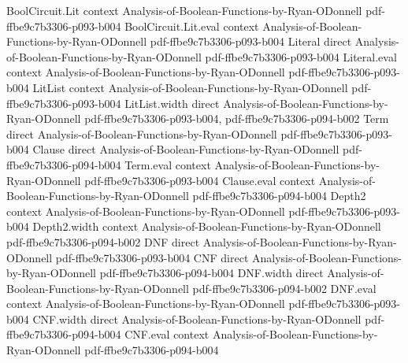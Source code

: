 \begin{theorem}
\label{DecisionTree.degree_le_depth}
\leanok
{}
\proofstep
  {BoolCircuit.Lit}
  {context}
  {Analysis-of-Boolean-Functions-by-Ryan-ODonnell}
  {pdf-ffbe9c7b3306-p093-b004}
\proofstep
  {BoolCircuit.Lit.eval}
  {context}
  {Analysis-of-Boolean-Functions-by-Ryan-ODonnell}
  {pdf-ffbe9c7b3306-p093-b004}
\proofstep
  {Literal}
  {direct}
  {Analysis-of-Boolean-Functions-by-Ryan-ODonnell}
  {pdf-ffbe9c7b3306-p093-b004}
\proofstep
  {Literal.eval}
  {context}
  {Analysis-of-Boolean-Functions-by-Ryan-ODonnell}
  {pdf-ffbe9c7b3306-p093-b004}
\proofstep
  {LitList}
  {context}
  {Analysis-of-Boolean-Functions-by-Ryan-ODonnell}
  {pdf-ffbe9c7b3306-p093-b004}
\proofstep
  {LitList.width}
  {direct}
  {Analysis-of-Boolean-Functions-by-Ryan-ODonnell}
  {pdf-ffbe9c7b3306-p093-b004,
    pdf-ffbe9c7b3306-p094-b002}
\proofstep
  {Term}
  {direct}
  {Analysis-of-Boolean-Functions-by-Ryan-ODonnell}
  {pdf-ffbe9c7b3306-p093-b004}
\proofstep
  {Clause}
  {direct}
  {Analysis-of-Boolean-Functions-by-Ryan-ODonnell}
  {pdf-ffbe9c7b3306-p094-b004}
\proofstep
  {Term.eval}
  {context}
  {Analysis-of-Boolean-Functions-by-Ryan-ODonnell}
  {pdf-ffbe9c7b3306-p093-b004}
\proofstep
  {Clause.eval}
  {context}
  {Analysis-of-Boolean-Functions-by-Ryan-ODonnell}
  {pdf-ffbe9c7b3306-p094-b004}
\proofstep
  {Depth2}
  {context}
  {Analysis-of-Boolean-Functions-by-Ryan-ODonnell}
  {pdf-ffbe9c7b3306-p093-b004}
\proofstep
  {Depth2.width}
  {context}
  {Analysis-of-Boolean-Functions-by-Ryan-ODonnell}
  {pdf-ffbe9c7b3306-p094-b002}
\proofstep
  {DNF}
  {direct}
  {Analysis-of-Boolean-Functions-by-Ryan-ODonnell}
  {pdf-ffbe9c7b3306-p093-b004}
\proofstep
  {CNF}
  {direct}
  {Analysis-of-Boolean-Functions-by-Ryan-ODonnell}
  {pdf-ffbe9c7b3306-p094-b004}
\proofstep
  {DNF.width}
  {direct}
  {Analysis-of-Boolean-Functions-by-Ryan-ODonnell}
  {pdf-ffbe9c7b3306-p094-b002}
\proofstep
  {DNF.eval}
  {context}
  {Analysis-of-Boolean-Functions-by-Ryan-ODonnell}
  {pdf-ffbe9c7b3306-p093-b004}
\proofstep
  {CNF.width}
  {direct}
  {Analysis-of-Boolean-Functions-by-Ryan-ODonnell}
  {pdf-ffbe9c7b3306-p094-b004}
\proofstep
  {CNF.eval}
  {context}
  {Analysis-of-Boolean-Functions-by-Ryan-ODonnell}
  {pdf-ffbe9c7b3306-p094-b004}

\end{theorem}
